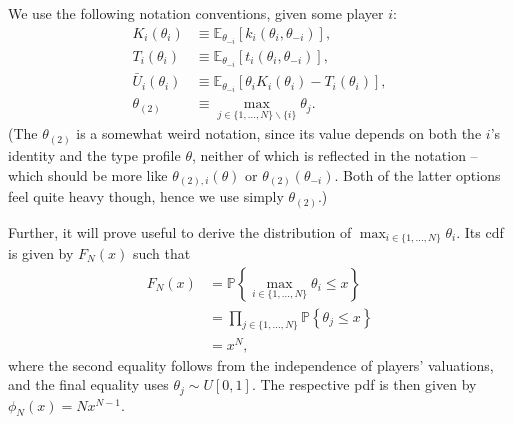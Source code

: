 \documentclass[a4paper]{article}
\begin{document}
We use the following notation conventions, given some player $i$:
\begin{align*}
	K_i(\theta_i) &\equiv \mathbb{E}_{\theta_{-i}} \left[ k_i(\theta_i,\theta_{-i}) \right],
	\\
	T_i(\theta_i) &\equiv \mathbb{E}_{\theta_{-i}} \left[ t_i(\theta_i,\theta_{-i}) \right],
	\\
	\bar{U}_i(\theta_i) &\equiv \mathbb{E}_{\theta_{-i}} \left[ \theta_i K_i(\theta_i) - T_i(\theta_i) \right],
	\\
	\theta_{(2)} &\equiv \max_{j \in \{1,...,N\} \backslash \{i\}} \theta_j .
\end{align*}
(The $\theta_{(2)}$ is a somewhat weird notation, since its value depends on both the $i$'s identity and the type profile $\theta$, neither of which is reflected in the notation -- which should be more like $\theta_{(2),i}(\theta)$ or $\theta_{(2)}(\theta_{-i})$. Both of the latter options feel quite heavy though, hence we use simply $\theta_{(2)}$.)

Further, it will prove useful to derive the distribution of $\max_{i \in \{1,...,N\}} \theta_i$. Its cdf is given by $F_N(x)$ such that
\begin{equation} \label{eq:auc_Fmax}
\begin{aligned}
	F_{N}(x) 
	&= \mathbb{P} \left\{ \max_{i \in \{1,...,N\}} \theta_i \leq x \right\}
	\\
	&= \prod_{j \in \{1,...,N\}} \mathbb{P} \left\{ \theta_j \leq x \right\}
	\\
	&= x^N,
\end{aligned}
\end{equation}
where the second equality follows from the independence of players' valuations, and the final equality uses $\theta_j \sim U[0,1]$. The respective pdf is then given by $\phi_{N}(x) = Nx^{N-1}$.
\end{document}
